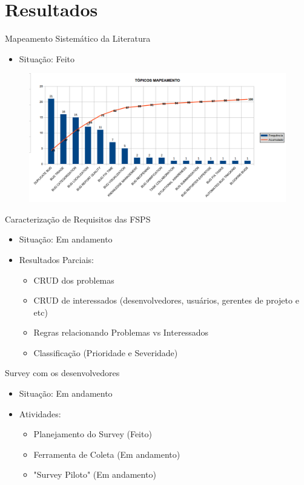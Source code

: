 \documentclass[t,14pt,mathserif]{beamer}
\begin{document}
\section{Resultados}

\begin{frame}{Mapeamento Sistemático da Literatura}
	
	\begin{itemize}
		\item Situação: Feito	
    \end{itemize}
	
	\begin{figure}[hbtp]
		\centering
		\includegraphics[scale=.39]{../img/mapeamento.png}
	\end{figure}
		
\end{frame}

\begin{frame}{Caracterização de Requisitos das FSPS}
		\begin{itemize}
			\item Situação: Em andamento
			\item Resultados Parciais:
				\begin{itemize}
					 \item CRUD dos problemas
					 \item CRUD de interessados (desenvolvedores, usuários, gerentes de projeto e etc)
					 \item Regras relacionando Problemas vs Interessados
		             \item Classificação (Prioridade e Severidade)				
				\end{itemize}
	    \end{itemize}
\end{frame}

\begin{frame}{Survey com os desenvolvedores}
		\begin{itemize}
			\item Situação: Em andamento
			\item Atividades:
			\begin{itemize}
				\item Planejamento do Survey (Feito)
				\item Ferramenta de Coleta (Em andamento)
				\item "Survey Piloto" (Em andamento)					
			\end{itemize}
		\end{itemize}
\end{frame}
\end{document}
